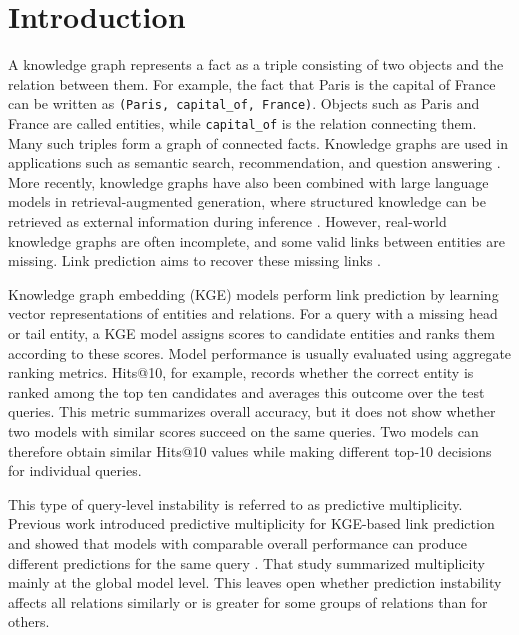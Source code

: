 \section{Introduction}
\label{chap:introduction}

A knowledge graph represents a fact as a triple consisting of two objects and
the relation between them. For example, the fact that Paris is the capital of
France can be written as \texttt{(Paris, capital\_of, France)}. Objects such as
Paris and France are called entities, while \texttt{capital\_of} is the
relation connecting them. Many such triples form a graph of connected facts.
Knowledge graphs are used in applications such as semantic search,
recommendation, and question answering
\citep{hogan2021knowledge,ji2022survey}. More recently, knowledge graphs have
also been combined with large language models in retrieval-augmented
generation, where structured knowledge can be retrieved as external
information during inference \citep{pan2024roadmap}. However, real-world
knowledge graphs are often incomplete, and some valid links between entities
are missing. Link prediction aims to recover these missing links
\citep{ji2022survey,rossi2021comparative}.

Knowledge graph embedding (KGE) models perform link prediction by learning
vector representations of entities and relations. For a query with a missing
head or tail entity, a KGE model assigns scores to candidate entities and ranks
them according to these scores. Model performance is usually evaluated using
aggregate ranking metrics. Hits@10, for example, records whether the correct
entity is ranked among the top ten candidates and averages this outcome over
the test queries. This metric summarizes overall accuracy, but it does not show
whether two models with similar scores succeed on the same queries. Two models
can therefore obtain similar Hits@10 values while making different top-10
decisions for individual queries.

This type of query-level instability is referred to as predictive
multiplicity. Previous work introduced predictive multiplicity for KGE-based
link prediction and showed that models with comparable overall performance can
produce different predictions for the same query
\citep{zhu2024predictive}. That study summarized multiplicity mainly at the
global model level. This leaves open whether prediction instability affects
all relations similarly or is greater for some groups of relations than for
others.

